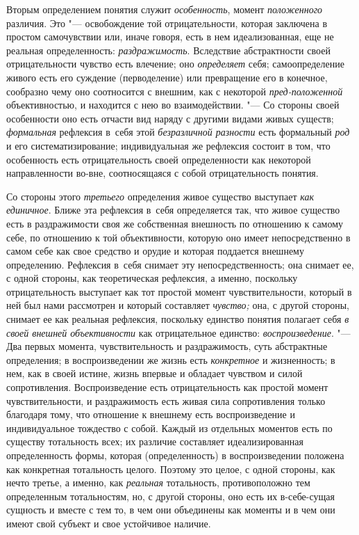 Вторым определением понятия служит
{\em особенность}, момент
{\em положенного}
различия. Это "--- освобождение той
отрицательности, которая заключена в простом самочувствии или, иначе
говоря, есть в нем идеализованная, еще не реальная определенность:
{\em раздражимость}.
Вследствие абстрактности своей отрицательности чувство есть
влечение; оно {\em определяет}
себя; самоопределение живого есть его суждение (перводеление)
или превращение его в конечное, сообразно чему оно соотносится с внешним,
как с некоторой {\em пред-положенной}
объективностью, и находится с нею во взаимодействии. "---
Со стороны своей особенности оно есть отчасти вид наряду с
другими видами живых существ;
{\em формальная}
рефлексия в~себя этой
{\em безразличной разности}
есть формальный {\em род}
и его систематизирование; индивидуальная же рефлексия состоит
в том, что особенность есть отрицательность своей определенности как
некоторой направленности во-вне, соотносящаяся с собой отрицательность
понятия.

Со стороны этого
{\em третьего}
определения живое существо выступает
{\em как единичное}.
Ближе эта рефлексия в~себя определяется так, что живое
существо есть в раздражимости своя же собственная внешность по отношению к
самому себе, по отношению к той объективности, которую оно имеет
непосредственно в самом себе как свое средство и орудие и которая поддается
внешнему определению. Рефлексия в~себя снимает эту непосредственность; она
снимает ее, с одной стороны, как теоретическая рефлексия, а именно,
поскольку отрицательность выступает как тот простой момент
чувствительности, который в ней был нами рассмотрен и который составляет
{\em чувство;} она, с
другой стороны, снимает ее как реальная рефлексия, поскольку единство
понятия полагает себя {\em в своей
внешней объективности} как отрицательное единство:
{\em воспроизведение}. "---
Два первых момента, чувствительность и раздражимость, суть
абстрактные определения; в воспроизведении же жизнь есть
{\em конкретное} и
жизненность; в нем, как в своей истине, жизнь впервые и обладает чувством и
силой сопротивления. Воспроизведение есть отрицательность как простой
момент чувствительности, и раздражимость есть живая сила сопротивления
только благодаря тому, что отношение к внешнему есть воспроизведение и
индивидуальное тождество с собой. Каждый из отдельных
моментов есть по существу тотальность всех; их различие составляет
идеализированная определенность формы, которая (определенность) в
воспроизведении положена как конкретная тотальность целого. Поэтому это
целое, с одной стороны, как нечто третье, а именно, как
{\em реальная}
тотальность, противоположно тем определенным тотальностям,
но, с другой стороны, оно есть их в-себе-сущая сущность и вместе с тем то,
в чем они объединены как моменты и в чем они имеют свой субъект и свое
устойчивое наличие.

